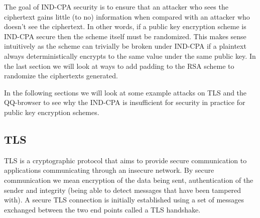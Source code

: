 \indent The goal of IND-CPA security is to ensure that an attacker who sees the ciphertext gains little (to no) information when compared with an attacker who doesn't see the ciphertext. In other words, if a public key encryption scheme is IND-CPA secure then the scheme itself must be randomized. This makes sense intuitively as the scheme can trivially be broken under IND-CPA if a plaintext always deterministically encrypts to the same value under the same public key. In the last section we will look at ways to add padding to the RSA scheme to randomize the ciphertexts generated.

\indent In the following sections we will look at some example attacks on TLS and the QQ-browser to see why the IND-CPA is insufficient for security in practice for public key encryption schemes.

\subsection{TLS}
TLS is a cryptographic protocol that aims to provide secure communication to applications communicating through an insecure network. By secure communication we mean encryption of the data  being sent, authentication of the sender and integrity (being able to detect messages that have been tampered with). \newline
\indent A secure TLS connection is initially established using a set of messages exchanged between the two end points called a TLS handshake. \newline

